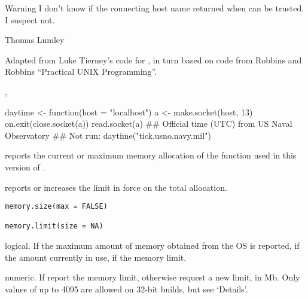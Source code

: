%
\begin{Section}{Warning}
I don't know if the connecting host name returned
when  can be trusted.  I suspect not.
\end{Section}
%
\begin{Author}\relax
Thomas Lumley
\end{Author}
%
\begin{References}\relax
Adapted from Luke Tierney's code for , in turn
based on code from Robbins and Robbins ``Practical UNIX Programming''.
\end{References}
%
\begin{SeeAlso}\relax
{}, 
\end{SeeAlso}
%
\begin{Examples}
\begin{ExampleCode}
daytime <- function(host = "localhost"){
    a <- make.socket(host, 13)
    on.exit(close.socket(a))
    read.socket(a)
}
## Official time (UTC) from US Naval Observatory
## Not run: daytime("tick.usno.navy.mil")
\end{ExampleCode}
\end{Examples}
%
\begin{Description}\relax
{} reports the current or maximum memory allocation of
the  function used in this version of \R{}.

 reports or increases the limit in force
on the total allocation.
\end{Description}
%
\begin{Usage}
\begin{verbatim}
memory.size(max = FALSE)

memory.limit(size = NA)
\end{verbatim}
\end{Usage}
%
\begin{Arguments}
\begin{ldescription}
\item[\code{max}] logical.  If  the maximum amount of memory
obtained from the OS is reported, if  the amount
currently in use, if  the memory limit.
\item[\code{size}] numeric.  If  report the memory limit, otherwise
request a new limit, in Mb.  Only values of up to 4095 are allowed on
32-bit \R{} builds, but see `Details'.
\end{ldescription}
\end{Arguments}
